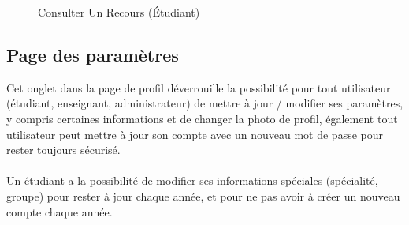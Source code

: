 \documentclass[12pt]{report}
\begin{document}
\begin{figure}[H]
\centering
  \caption{Consulter Un Recours (Étudiant)}
  \vspace*{-0.1in}
\end{figure}

\newpage

\subsection{Page des paramètres}
\vspace{0.2in}

Cet onglet dans la page de profil déverrouille la possibilité pour tout utilisateur (étudiant, enseignant, administrateur) de mettre à jour / modifier ses paramètres, y compris certaines informations et de changer la photo de profil, également tout utilisateur peut mettre à jour son compte avec un nouveau mot de passe pour rester toujours sécurisé.
\\\\
Un étudiant a la possibilité de modifier ses informations spéciales (spécialité, groupe) pour rester à jour chaque année, et pour ne pas avoir à créer un nouveau compte chaque année.

\vspace{0.4in}
\end{document}
